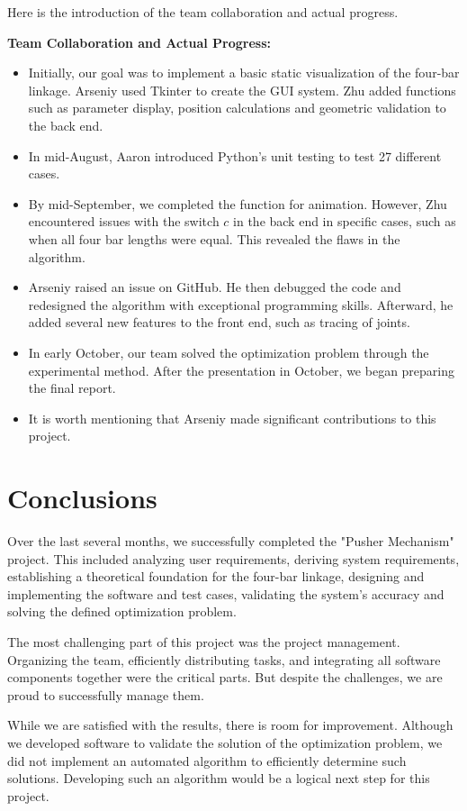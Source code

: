 \documentclass{article}
\begin{document}
Here is the introduction of the team collaboration and actual progress.

\textbf{Team Collaboration and Actual Progress:}
\begin{itemize}
    \item Initially, our goal was to implement a basic static visualization of the four-bar linkage. Arseniy used Tkinter to create the GUI system. Zhu added functions such as parameter display, position calculations and geometric validation to the back end.
    \item In mid-August, Aaron introduced Python's unit testing to test 27 different cases.
    \item By mid-September, we completed the function for animation. However, Zhu encountered issues with the switch \(c\) in the back end in specific cases, such as when all four bar lengths were equal. This revealed the flaws in the algorithm.
    \item Arseniy raised an issue on GitHub. He then debugged the code and redesigned the algorithm with exceptional programming skills. Afterward, he added several new features to the front end, such as tracing of joints.
    \item In early October, our team solved the optimization problem through the experimental method. After the presentation in October, we began preparing the final report.  
    \item It is worth mentioning that Arseniy made significant contributions to this project.
\end{itemize}

\section{Conclusions}

Over the last several months, we successfully completed the "Pusher Mechanism" project. This included analyzing user requirements, deriving system requirements, establishing a theoretical foundation for the four-bar linkage, designing and implementing the software and test cases, validating the system's accuracy and solving the defined optimization problem.

The most challenging part of this project was the project management. Organizing the team, efficiently distributing tasks, and integrating all software components together were the critical parts. But despite the challenges, we are proud to successfully manage them.

While we are satisfied with the results, there is room for improvement. Although we developed software to validate the solution of the optimization problem, we did not implement an automated algorithm to efficiently determine such solutions. Developing such an algorithm would be a logical next step for this project.
\end{document}
